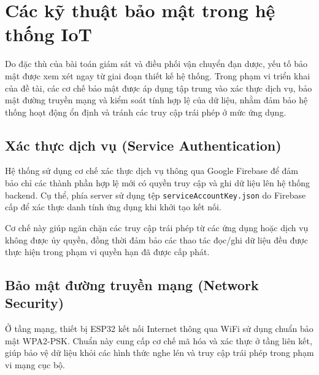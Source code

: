 
\section{Các kỹ thuật bảo mật trong hệ thống IoT}

Do đặc thù của bài toán giám sát và điều phối vận chuyển đạn dược, yếu tố bảo mật
được xem xét ngay từ giai đoạn thiết kế hệ thống. Trong phạm vi triển khai của đề
tài, các cơ chế bảo mật được áp dụng tập trung vào xác thực dịch vụ, bảo mật đường
truyền mạng và kiểm soát tính hợp lệ của dữ liệu, nhằm đảm bảo hệ thống hoạt động
ổn định và tránh các truy cập trái phép ở mức ứng dụng.

\subsection{Xác thực dịch vụ (Service Authentication)}

Hệ thống sử dụng cơ chế xác thực dịch vụ thông qua Google Firebase để đảm bảo chỉ
các thành phần hợp lệ mới có quyền truy cập và ghi dữ liệu lên hệ thống backend.
Cụ thể, phía server sử dụng tệp \texttt{serviceAccountKey.json} do Firebase cấp để
xác thực danh tính ứng dụng khi khởi tạo kết nối.

Cơ chế này giúp ngăn chặn các truy cập trái phép từ các ứng dụng hoặc dịch vụ không
được ủy quyền, đồng thời đảm bảo các thao tác đọc/ghi dữ liệu đều được thực hiện
trong phạm vi quyền hạn đã được cấp phát.

\subsection{Bảo mật đường truyền mạng (Network Security)}

Ở tầng mạng, thiết bị ESP32 kết nối Internet thông qua WiFi sử dụng chuẩn bảo mật
WPA2-PSK. Chuẩn này cung cấp cơ chế mã hóa và xác thực ở tầng liên kết, giúp bảo vệ
dữ liệu khỏi các hình thức nghe lén và truy cập trái phép trong phạm vi mạng cục
bộ.

